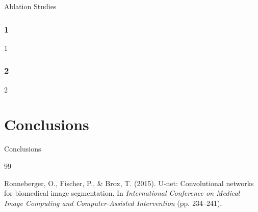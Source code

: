 \documentclass[runningheads]{llncs}
\begin{document}
Ablation Studies

\subsubsection{1}

1




\subsubsection{2}

2




\section{Conclusions}

Conclusions







\begin{thebibliography}{99}

Ronneberger, O., Fischer, P., \& Brox, T. (2015). U-net: Convolutional networks for biomedical image segmentation. In \textit{International Conference on Medical Image Computing and Computer-Assisted Intervention} (pp. 234–241).

\end{thebibliography}
\end{document}

